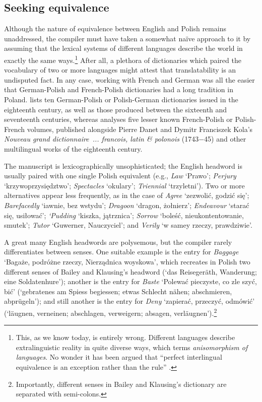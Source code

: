 \documentclass[output=paper,colorlinks,citecolor=brown,arabicfont,chinesefont]{langscibook}
\begin{document}
\subsection{Seeking equivalence}

Although the nature of equivalence between English and Polish remains unaddressed, the compiler must have taken a somewhat naïve approach to it by assuming that the lexical systems of different languages describe the world in exactly the same ways.\footnote{This, as we know today, is entirely wrong. Different languages describe extralinguistic reality in quite diverse ways, which \citet[295]{Zgusta1971} terms \emph{anisomorphism of languages}. No wonder it has been argued that “perfect interlingual equivalence is an exception rather than the rule” \citep[201]{Adamska-salaciak2020}.} After all, a plethora of dictionaries which paired the vocabulary of two or more languages might attest that translatability is an undisputed fact. In any case, working with French and German was all the easier that German-Polish and French-Polish dictionaries had a long tradition in Poland. \citet[358]{Fraczek_agnieszka1999} lists ten German-Polish or Polish-German dictionaries issued in the eighteenth century, as well as those produced between the sixteenth and seventeenth centuries, whereas \citet{Jakubczyk_marcin2016} analyses five lesser known French-Polish or Polish-French volumes, published alongside Pierre Danet and Dymitr Franciszek Kola’s \emph{Nouveau grand dictionnaire~... francois, latin \& polonois} (1743−45) and other multilingual works of the eighteenth century. 

The manuscript is lexicographically unsophisticated; the English headword is usually paired with one single Polish equivalent (e.g., \emph{Law} ‘Prawo’; \emph{Perjury} ‘krzywoprzysiędztwo’; \emph{Spectacles} ‘okulary’; \emph{Triennial} ‘trzyletni’). Two or more alternatives appear less frequently, as in the case of \emph{Agree} ‘zezwolić, godzić się’; \emph{Barefacedly} ‘iawnie, bez wstydu’; \emph{Dragoon} ‘dragon, żołnierz’; \emph{Endeavour} ‘starać się, usiłować’; \emph{‘Pudding} ‘kiszka, jątrznica’; \emph{Sorrow} ‘boleść, nieukontentowanie, smutek’; \emph{Tutor} ‘Guwerner, Nauczyciel’; and \emph{Verily} ‘w samey rzeczy, prawdziwie’.

A great many English headwords are polysemous, but the compiler rarely differentiates between senses. One suitable example is the entry for \emph{Baggage} ‘Bagaże, podróżne rzeczy, Nierządnica woyskowa’, which recreates in Polish two different senses of Bailey and Klausing’s headword (‘das Reisegeräth, Wanderung; eine Soldatenhure’); another is the entry for \emph{Baste} ‘Polewać pieczyste, co zle szyć, bić’ (‘gebratenes am Spiess begiessen; etwas Schlecht nähen; abschmieren, abprügeln’); and still another is the entry for \emph{Deny} ‘zapierać, przeczyć, odmówić’ (‘läugnen, verneinen; abschlagen, verweigern; absagen, verläugnen’).\footnote{Importantly, different senses in Bailey and Klausing’s dictionary are separated with semi-colons.}
\end{document}
